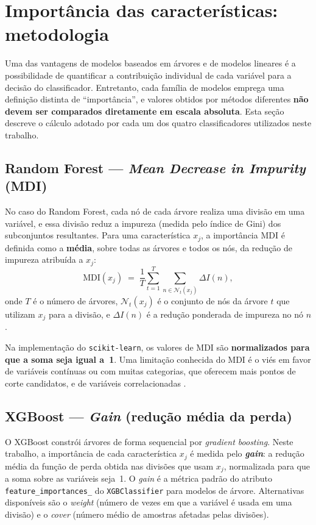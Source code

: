 \section{Importância das características: metodologia}
\label{sec:feature_importance_metodologia}

Uma das vantagens de modelos baseados em árvores e de modelos lineares é a possibilidade de quantificar a contribuição individual de cada variável para a decisão do classificador. Entretanto, cada família de modelos emprega uma definição distinta de ``importância'', e valores obtidos por métodos diferentes \textbf{não devem ser comparados diretamente em escala absoluta}. Esta seção descreve o cálculo adotado por cada um dos quatro classificadores utilizados neste trabalho.

\subsection{Random Forest --- \textit{Mean Decrease in Impurity} (MDI)}

No caso do Random Forest, cada nó de cada árvore realiza uma divisão em uma variável, e essa divisão reduz a impureza (medida pelo índice de Gini) dos subconjuntos resultantes. Para uma característica $x_j$, a importância MDI é definida como a \textbf{média}, sobre todas as árvores e todos os nós, da redução de impureza atribuída a $x_j$:
%
\[
\text{MDI}(x_j) \;=\; \frac{1}{T}\sum_{t=1}^{T}\sum_{n \in \mathcal{N}_t(x_j)} \Delta I(n),
\]
%
onde $T$ é o número de árvores, $\mathcal{N}_t(x_j)$ é o conjunto de nós da árvore $t$ que utilizam $x_j$ para a divisão, e $\Delta I(n)$ é a redução ponderada de impureza no nó $n$.

Na implementação do \texttt{scikit-learn}, os valores de MDI são \textbf{normalizados para que a soma seja igual a~1}. Uma limitação conhecida do MDI é o viés em favor de variáveis contínuas ou com muitas categorias, que oferecem mais pontos de corte candidatos, e de variáveis correlacionadas \citep{Strobl2007}.

\subsection{XGBoost --- \textit{Gain} (redução média da perda)}

O XGBoost constrói árvores de forma sequencial por \textit{gradient boosting}. Neste trabalho, a importância de cada característica $x_j$ é medida pelo \textbf{\textit{gain}}: a redução média da função de perda obtida nas divisões que usam $x_j$, normalizada para que a soma sobre as variáveis seja~1. O \textit{gain} é a métrica padrão do atributo \texttt{feature\_importances\_} do \texttt{XGBClassifier} para modelos de árvore. Alternativas disponíveis são o \textit{weight} (número de vezes em que a variável é usada em uma divisão) e o \textit{cover} (número médio de amostras afetadas pelas divisões).

